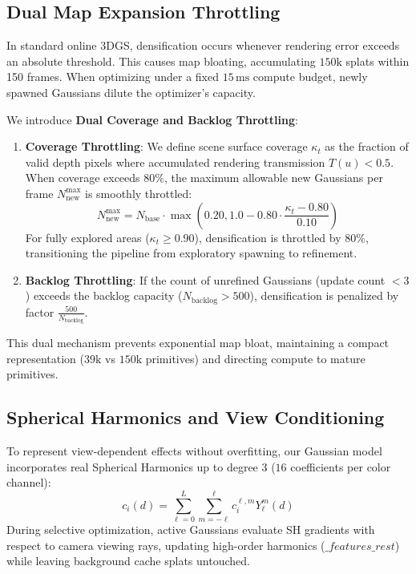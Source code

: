 \documentclass[10pt,twocolumn,letterpaper]{article}
\begin{document}
\subsection{Dual Map Expansion Throttling}
In standard online 3DGS, densification occurs whenever rendering error exceeds an absolute threshold. This causes map bloating, accumulating $150\mathrm{k}$ splats within 150 frames. When optimizing under a fixed $15\,\mathrm{ms}$ compute budget, newly spawned Gaussians dilute the optimizer's capacity.

We introduce \textbf{Dual Coverage and Backlog Throttling}:
\begin{enumerate}
\item \textbf{Coverage Throttling}: We define scene surface coverage $\kappa_t$ as the fraction of valid depth pixels where accumulated rendering transmission $T(u) < 0.5$. When coverage exceeds $80\%$, the maximum allowable new Gaussians per frame $N_{\mathrm{new}}^{\max}$ is smoothly throttled:
\begin{equation}
N_{\mathrm{new}}^{\max} = N_{\mathrm{base}} \cdot \max\left(0.20, 1.0 - 0.80 \cdot \frac{\kappa_t - 0.80}{0.10}\right)
\end{equation}
For fully explored areas ($\kappa_t \ge 0.90$), densification is throttled by $80\%$, transitioning the pipeline from exploratory spawning to refinement.
\item \textbf{Backlog Throttling}: If the count of unrefined Gaussians (update count $< 3$) exceeds the backlog capacity ($N_{\mathrm{backlog}} > 500$), densification is penalized by factor $\frac{500}{N_{\mathrm{backlog}}}$.
\end{enumerate}
This dual mechanism prevents exponential map bloat, maintaining a compact representation ($39\mathrm{k}$ vs $150\mathrm{k}$ primitives) and directing compute to mature primitives.

\subsection{Spherical Harmonics and View Conditioning}
To represent view-dependent effects without overfitting, our Gaussian model incorporates real Spherical Harmonics up to degree 3 ($16$ coefficients per color channel):
\begin{equation}
c_i(d) = \sum_{\ell=0}^{L} \sum_{m=-\ell}^{\ell} c_i^{\ell, m} Y_\ell^m(d)
\end{equation}
During selective optimization, active Gaussians evaluate SH gradients with respect to camera viewing rays, updating high-order harmonics ($\_features\_rest$) while leaving background cache splats untouched.
\end{document}
